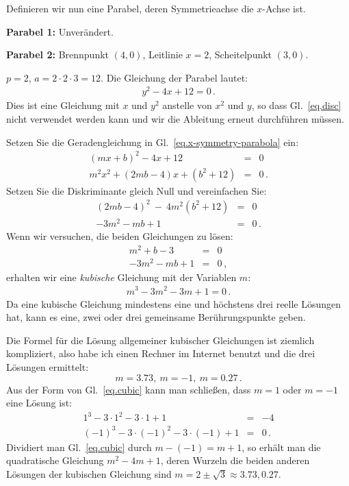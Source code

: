 \begin{example}\mbox{}

\noindent{}Definieren wir nun eine Parabel, deren Symmetrieachse die $x$-Achse ist.

\noindent\textbf{Parabel 1:} Unverändert. 

\noindent\textbf{Parabel 2:} Brennpunkt $(4,0)$, Leitlinie $x=2$, Scheitelpunkt $(3,0)$.

\noindent{}$p=2$, $a=2\cdot 2\cdot 3=12$. Die Gleichung der Parabel lautet:
\begin{align}
y^2-4x+12 = 0\,.\label{eq.x-symmetry-parabola}
\end{align}
Dies ist eine Gleichung mit $x$ und $y^2$ anstelle von $x^2$ und $y$, so dass Gl.~\ref{eq.disc} nicht verwendet werden kann und wir die Ableitung erneut durchführen müssen.

Setzen Sie die Geradengleichung in Gl.~\ref{eq.x-symmetry-parabola} ein:
\begin{eqnarray*}
(mx+b)^2-4x+12&=&0\\
m^2x^2+(2mb-4)x+(b^2+12)&=&0\,.
\end{eqnarray*}
Setzen Sie die Diskriminante gleich Null und vereinfachen Sie:
\begin{eqnarray*}
(2mb-4)^2\:-\:4m^2(b^2+12)&=&0\\
-3m^2-mb+1&=&0\,.
\end{eqnarray*}
Wenn wir versuchen, die beiden Gleichungen zu lösen:
\begin{eqnarray*}
m^2+b-3&=&0\\
-3m^2-mb+1&=&0\,,
\end{eqnarray*}
erhalten wir eine \emph{kubische} Gleichung mit der Variablen $m$:
\begin{align}
m^3-3m^2-3m+1=0\,.\label{eq.cubic}
\end{align}
Da eine kubische Gleichung mindestens eine und höchstens drei reelle Lösungen hat, kann es eine, zwei oder drei gemeinsame Berührungspunkte geben.

Die Formel für die Lösung allgemeiner kubischer Gleichungen ist ziemlich kompliziert, also habe ich einen Rechner im Internet benutzt und die drei Lösungen ermittelt:
\[m=3.73,\:m=-1,\:m=0.27\,.\]
Aus der Form von Gl.~\ref{eq.cubic} kann man schließen, dass $m=1$ oder $m=-1$ eine Lösung ist:
\begin{eqnarray*}
1^3-3\cdot 1^2-3\cdot 1+1&=&-4\\
(-1)^3-3\cdot (-1)^2-3\cdot(-1)+1&=&0\,.
\end{eqnarray*}
Dividiert man Gl.~\ref{eq.cubic} durch $m-(-1)=m+1$, so erhält man die quadratische Gleichung $m^2-4m+1$, deren Wurzeln die beiden anderen Lösungen der kubischen Gleichung sind $m=2\pm\sqrt{3}\approx 3.73, 0.27$.
\end{example}

